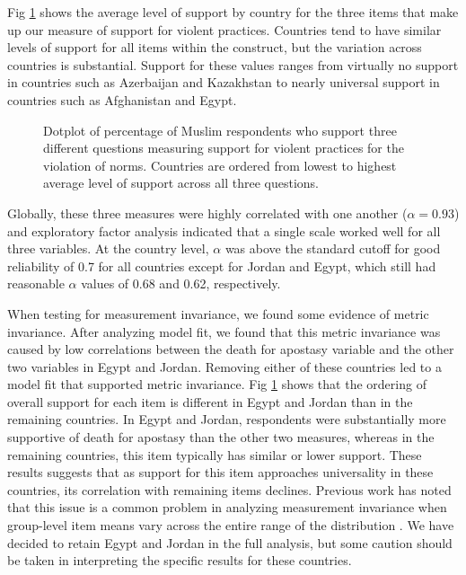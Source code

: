 \documentclass[10pt,letterpaper]{article}
\begin{document}
Fig \ref{fig:country-averages} shows the average level of support by country for the three items that make up our measure of support for violent practices. Countries tend to have similar levels of support for all items within the construct, but the variation across countries is substantial. Support for these values ranges from virtually no support in countries such as Azerbaijan and Kazakhstan to nearly universal support in countries such as Afghanistan and Egypt.

\begin{figure}[!h]
\centering
\caption{Dotplot of percentage of Muslim respondents who support three different questions measuring support for violent practices for the violation of norms. Countries are ordered from lowest to highest average level of support across all three questions.}
\label{fig:country-averages}
\end{figure}

Globally, these three measures were highly correlated with one another (\(\alpha=0.93\)) and exploratory factor analysis indicated that a single scale worked well for all three variables. At the country level, \(\alpha\) was above the standard cutoff for good reliability of 0.7 for all countries except for Jordan and Egypt, which still had reasonable \(\alpha\) values of 0.68 and 0.62, respectively.

When testing for measurement invariance, we found some evidence of metric invariance. After analyzing model fit, we found that this metric invariance was caused by low correlations between the death for apostasy variable and the other two variables in Egypt and Jordan. Removing either of these countries led to a model fit that supported metric invariance. Fig \ref{fig:country-averages} shows that the ordering of overall support for each item is different in Egypt and Jordan than in the remaining countries. In Egypt and Jordan, respondents were substantially more supportive of death for apostasy than the other two measures, whereas in the remaining countries, this item typically has similar or lower support. These results suggests that as support for this item approaches universality in these countries, its correlation with remaining items declines.  Previous work has noted that this issue is a common problem in analyzing measurement invariance when group-level item means vary across the entire range of the distribution \cite{welzel_noninvariance_2021}. We have decided to retain Egypt and Jordan in the full analysis, but some caution should be taken in interpreting the specific results for these countries.
\end{document}
